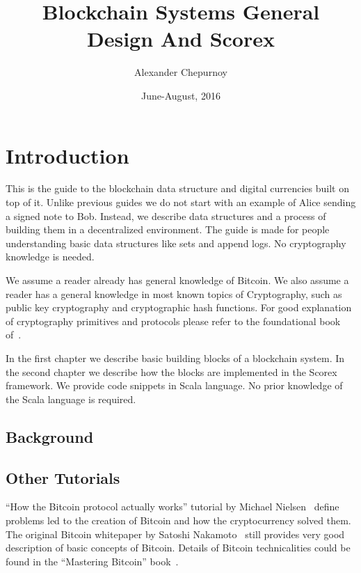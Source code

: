 \documentclass[]{report}   %
\begin{document}
\lstset{language=Scala}

\title{Blockchain Systems General Design And Scorex}
\author{Alexander Chepurnoy}         
\date{June-August, 2016}
\maketitle


\chapter{Introduction}

This is the guide to the blockchain data structure and digital currencies built on top of it. Unlike previous guides we do not start with an example of Alice sending a signed note to Bob. Instead, we describe data structures and a process of building them in a decentralized environment. The guide is made for people understanding basic data structures like sets and append logs. No cryptography knowledge is needed.

We assume a reader already has general knowledge of Bitcoin. We also assume a reader has a general knowledge in most known topics of Cryptography, such as public key cryptography and cryptographic hash functions. For good explanation of cryptography primitives and protocols please refer to the foundational book of~\cite{katz2014introduction}. 

In the first chapter we describe basic building blocks of a blockchain system. In the second chapter we describe how the blocks are implemented in the Scorex framework. We provide code snippets in Scala language. No prior knowledge of the Scala language is required.

\section{Background}

\section{Other Tutorials}

``How the Bitcoin protocol actually works'' tutorial by Michael Nielsen~\cite{nielsen} define problems led to the creation of Bitcoin and how the cryptocurrency solved them. The original Bitcoin whitepaper by Satoshi Nakamoto~\cite{Nakamoto2008} still provides very good description of basic concepts of Bitcoin. Details of Bitcoin technicalities could be found in the ``Mastering Bitcoin'' book~\cite{antonopoulos2014mastering}.
\end{document}
